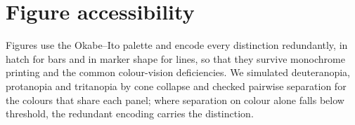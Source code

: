 \documentclass{article}
\begin{document}
\section{Figure accessibility}
\label{app:figures}

Figures use the Okabe--Ito palette \citep{okabe2008} and encode every distinction redundantly, in
hatch for bars and in marker shape for lines, so that they survive monochrome printing and the
common colour-vision deficiencies. We simulated deuteranopia, protanopia and tritanopia by cone
collapse and checked pairwise separation for the colours that share each panel; where separation on
colour alone falls below threshold, the redundant encoding carries the distinction.
\end{document}
